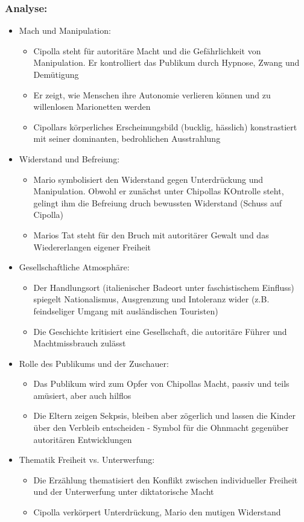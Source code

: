 \subsubsection{Analyse:}
\begin{itemize}
    \item Mach und Manipulation:
    \begin{itemize}
        \item Cipolla steht für autoritäre Macht und die Gefährlichkeit von Manipulation. Er kontrolliert das Publikum durch Hypnose, Zwang und Demütigung
        \item Er zeigt, wie Menschen ihre Autonomie verlieren können und zu willenlosen Marionetten werden
        \item Cipollars körperliches Erscheinungsbild (bucklig, hässlich) konstrastiert mit seiner dominanten, bedrohlichen Ausstrahlung
    \end{itemize}
    \item Widerstand und Befreiung:
    \begin{itemize}
        \item Mario symbolisiert den Widerstand gegen Unterdrückung und Manipulation. Obwohl er zunächst unter Chipollas KOntrolle steht, gelingt ihm die Befreiung druch bewussten Widerstand (Schuss auf Cipolla)
        \item Marios Tat steht für den Bruch mit autoritärer Gewalt und das Wiedererlangen eigener Freiheit
    \end{itemize}
    \item Gesellschaftliche Atmosphäre:
    \begin{itemize}
        \item Der Handlungsort (italienischer Badeort unter faschistischem Einfluss) spiegelt Nationalismus, Ausgrenzung und Intoleranz wider (z.B. feindseliger Umgang mit ausländischen Touristen)
        \item Die Geschichte kritisiert eine Gesellschaft, die autoritäre Führer und Machtmissbrauch zulässt
    \end{itemize}
    \item Rolle des Publikums und der Zuschauer:
    \begin{itemize}
        \item Das Publikum wird zum Opfer von Chipollas Macht, passiv und teils amüsiert, aber auch hilflos
        \item Die Eltern zeigen Sekpsis, bleiben aber zögerlich und lassen die Kinder über den Verbleib entscheiden - Symbol für die Ohnmacht gegenüber autoritären Entwicklungen
    \end{itemize}
    \item Thematik Freiheit vs. Unterwerfung:
    \begin{itemize}
        \item Die Erzählung thematisiert den Konflikt zwischen individueller Freiheit und der Unterwerfung unter diktatorische Macht
        \item Cipolla verkörpert Unterdrückung, Mario den mutigen Widerstand
    \end{itemize}
\end{itemize}
